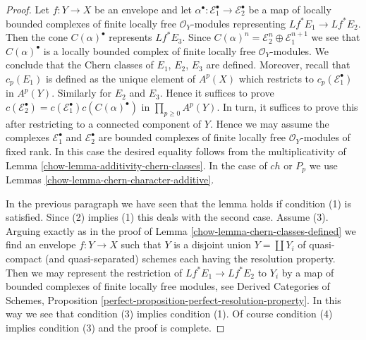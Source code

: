 \begin{proof}

Let $f : Y \to X$ be an envelope and let
$\alpha^\bullet : \mathcal{E}_1^\bullet \to \mathcal{E}_2^\bullet$
be a map of locally bounded complexes of finite locally free
$\mathcal{O}_Y$-modules representing $Lf^*E_1 \to Lf^*E_2$.
Then the cone $C(\alpha)^\bullet$ represents $Lf^*E_3$. Since
$C(\alpha)^n = \mathcal{E}_2^n \oplus \mathcal{E}_1^{n + 1}$
we see that $C(\alpha)^\bullet$ is a locally bounded complex
of finite locally free $\mathcal{O}_Y$-modules.
We conclude that the Chern classes of $E_1$, $E_2$, $E_3$
are defined. Moreover, recall that $c_p(E_1)$ is defined
as the unique element of $A^p(X)$ which restricts to
$c_p(\mathcal{E}_1^\bullet)$ in $A^p(Y)$. Similarly for
$E_2$ and $E_3$. Hence it suffices
to prove $c(\mathcal{E}_2^\bullet) =
c(\mathcal{E}_1^\bullet) c(C(\alpha)^\bullet)$
in $\prod_{p \geq 0} A^p(Y)$.
In turn, it suffices to prove this after restricting
to a connected component of $Y$. Hence we may assume
the complexes $\mathcal{E}_1^\bullet$ and $\mathcal{E}_2^\bullet$
are bounded complexes of finite locally free $\mathcal{O}_Y$-modules
of fixed rank. In this case the desired equality follows from the
multiplicativity of Lemma \ref{chow-lemma-additivity-chern-classes}.
In the case of $ch$ or $P_p$ we use
Lemmas \ref{chow-lemma-chern-character-additive}.

\medskip\noindent
In the previous paragraph we have seen that the lemma holds if
condition (1) is satisfied. Since (2) implies (1) this deals with
the second case. Assume (3). Arguing exactly as in the proof of
Lemma \ref{chow-lemma-chern-classes-defined} we find an envelope
$f : Y \to X$ such that $Y$ is a disjoint union $Y = \coprod Y_i$
of quasi-compact (and quasi-separated) schemes each having the
resolution property. Then we may represent the restriction of
$Lf^*E_1 \to Lf^*E_2$ to $Y_i$ by a map of bounded complexes
of finite locally free modules, see
Derived Categories of Schemes, Proposition
\ref{perfect-proposition-perfect-resolution-property}.
In this way we see that condition (3) implies condition (1).
Of course condition (4) implies condition (3) and the proof
is complete.
\end{proof}

